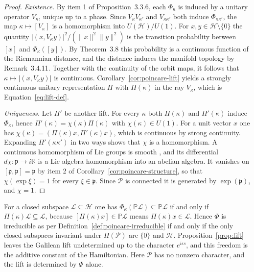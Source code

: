 \begin{proof}
	\emph{Existence.} By item 1 of Proposition~3.3.6, each $\Phi_\kappa$ is induced by a unitary operator $V_\kappa$, unique up to a phase. Since $V_\kappa V_{\kappa'}$ and $V_{\kappa\kappa'}$ both induce $\Phi_{\kappa\kappa'}$, the map $\kappa\mapsto[V_\kappa]$ is a homomorphism into $U(\mathcal{H})/U(1)$. For $x,y\in\mathcal{H}\setminus\{0\}$ the quantity $|(x,V_\kappa y)|^2/(\|x\|^2\|y\|^2)$ is the transition probability between $[x]$ and $\Phi_\kappa([y])$. By Theorem~3.8 this probability is a continuous function of the Riemannian distance, and the distance induces the manifold topology by Remark~3.4.11. Together with the continuity of the orbit maps, it follows that $\kappa\mapsto|(x,V_\kappa y)|$ is continuous. Corollary~\ref{cor:poincare-lift} yields a strongly continuous unitary representation $\Pi$ with $\Pi(\kappa)$ in the ray $V_\kappa$, which is Equation~\eqref{eq:lift-def}.
	
	\emph{Uniqueness.} Let $\Pi'$ be another lift. For every $\kappa$ both $\Pi(\kappa)$ and $\Pi'(\kappa)$ induce $\Phi_\kappa$, hence $\Pi'(\kappa)=\chi(\kappa)\Pi(\kappa)$ with $\chi(\kappa)\in U(1)$. For a unit vector $x$ one has $\chi(\kappa)=(\Pi(\kappa)x,\Pi'(\kappa)x)$, which is continuous by strong continuity. Expanding $\Pi'(\kappa\kappa')$ in two ways shows that $\chi$ is a homomorphism. A continuous homomorphism of Lie groups is smooth \cite[TODO-location]{TODO-Lee13}, and its differential $d\chi:\mathfrak{p}\to i\mathbb{R}$ is a Lie algebra homomorphism into an abelian algebra. It vanishes on $[\mathfrak{p},\mathfrak{p}]=\mathfrak{p}$ by item 2 of Corollary~\ref{cor:poincare-structure}, so that $\chi(\exp\xi)=1$ for every $\xi\in\mathfrak{p}$. Since $\mathcal{P}$ is connected it is generated by $\exp(\mathfrak{p})$, and $\chi=1$.
\end{proof}

\begin{remark}
	For a closed subspace $\mathcal{L}\subseteq\mathcal{H}$ one has $\Phi_\kappa(\mathbb{P}\mathcal{L})\subseteq\mathbb{P}\mathcal{L}$ if and only if $\Pi(\kappa)\mathcal{L}\subseteq\mathcal{L}$, because $[\Pi(\kappa)x]\in\mathbb{P}\mathcal{L}$ means $\Pi(\kappa)x\in\mathcal{L}$. Hence $\Phi$ is irreducible as per Definition~\ref{def:poincare-irreducible} if and only if the only closed subspaces invariant under $\Pi(\mathcal{P})$ are $\{0\}$ and $\mathcal{H}$. Proposition~\ref{prop:lift} leaves the Galilean lift undetermined up to the character $e^{i\epsilon s}$, and this freedom is the additive constant of the Hamiltonian. Here $\mathcal{P}$ has no nonzero character, and the lift is determined by $\Phi$ alone.
\end{remark}

